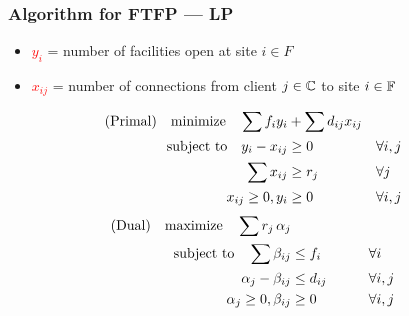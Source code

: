 \documentclass[hyperref,dvipsnames,svgnames,compress]{beamer}
\begin{document}
\begin{frame}
  \frametitle{Algorithm for FTFP --- LP}
  \begin{itemize}
  \item \textcolor{red}{$y_i$} = number of facilities open at site $i\in F$
  \item \textcolor{red}{$x_{ij}$} = number of connections from client $j\in
    \mathbb{C}$ to site $i \in \mathbb{F}$
  \end{itemize}
  \begin{alignat*}{3}
    \text{(Primal)} \quad\textrm{minimize}\quad \sum f_iy_i &+ \sum d_{ij}x_{ij}&
    \\ \notag
    \textrm{subject to}\quad y_i - x_{ij} &\geq 0  & &\forall i,j
    \\ \notag
    \sum x_{ij} &\geq r_j & &\forall j
    \\ \notag
    x_{ij} \geq 0, y_i &\geq 0 & &\forall i,j
  \end{alignat*}
  \begin{alignat*}{3}
  \text{(Dual)}\quad  \textrm{maximize}\quad \sum r_j\, \alpha_j&
    \\ \notag
    \textrm{subject to} \quad 
      \sum \beta_{ij} &\leq f_i  &\quad\quad			&\forall i
    \\ \notag
    \alpha_{j} - \beta_{ij} 	&\leq  d_{ij}       &                 & \forall i,j
    \\ \notag
    \alpha_j \geq 0, \beta_{ij} &\geq 0           &            & \forall i,j
  \end{alignat*}
\end{frame}
\end{document}
